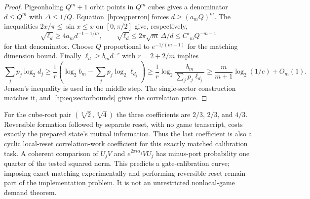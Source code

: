 \begin{proof}
Pigeonholing $Q^m+1$ orbit points in $Q^m$ cubes gives a denominator $d\le Q^m$ with $\Delta\le1/Q$. Equation~\eqref{hp:eq:perron} forces $d\ge(a_mQ)^m$. The inequalities $2x/\pi\le\sin x\le x$ on $[0,\pi/2]$ give, respectively,
\[
 \sqrt{\ell_d}\ge4a_m d^{-1-1/m},\qquad
 \sqrt{\ell_d}\le2\pi\sqrt m\,\Delta/d\le C'_mQ^{-m-1}
\]
for that denominator. Choose $Q$ proportional to $e^{-1/(m+1)}$ for the matching dimension bound. Finally $\ell_d\ge b_md^{-r}$ with $r=2+2/m$ implies
\[
 \sum_jp_j\log_2d_j
 \ge\frac1r\left(\log_2b_m-\sum_jp_j\log_2\ell_{d_j}\right)
 \ge\frac1r\log_2\frac{b_m}{\sum_jp_j\ell_{d_j}}
 \ge\frac m{m+1}\log_2(1/e)+O_m(1).
\]
Jensen's inequality is used in the middle step. The single-sector construction matches it, and~\eqref{hp:eq:sectorbounds} gives the correlation price.
\end{proof}

For the cube-root pair $(\sqrt[3]2,\sqrt[3]4)$ the three coefficients are $2/3$, $2/3$, and $4/3$. Reversible formation followed by separate reset, with no game transcript, costs exactly the prepared state's mutual information. Thus the last coefficient is also a cyclic local-reset correlation-work coefficient for this exactly matched calibration task. A coherent comparison of $U_jV$ and $e^{2\pi i\alpha_j}VU_j$ has minus-port probability one quarter of the tested squared norm. This predicts a gate-calibration curve; imposing exact matching experimentally and performing reversible reset remain part of the implementation problem. It is not an unrestricted nonlocal-game demand theorem.
